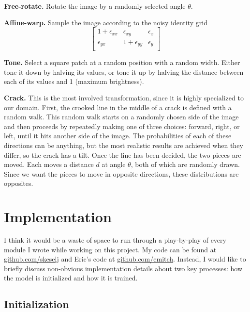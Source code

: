 \documentclass[12pt,a4paper]{article}
\begin{document}
{\bf Free-rotate.} Rotate the image by a randomly selected angle $\theta$. 

{\bf Affine-warp.} Sample the image according to the noisy identity grid 
\[
\begin{bmatrix}
    1 + \epsilon_{xx}		& \epsilon_{xy}  		& \epsilon_{x} \\
    \epsilon_{yx}       	& 1 + \epsilon_{yy}  	& \epsilon_{y} \\
\end{bmatrix}
\]

{\bf Tone.} Select a square patch at a random position with a random width. Either tone it down by halving its values, or tone it up by halving the distance between each of its values and 1 (maximum brightness).

{\bf Crack.} This is the most involved transformation, since it is highly specialized to our domain. First, the crooked line in the middle of a crack is defined with a random walk. This random walk starts on a randomly chosen side of the image and then proceeds by repeatedly making one of three choices: forward, right, or left, until it hits another side of the image. The probabilities of each of these directions can be anything, but the most realistic results are achieved when they differ, so the crack has a tilt. Once the line has been decided, the two pieces are moved. Each moves a distance $d$ at angle $\theta$, both of which are randomly drawn. Since we want the pieces to move in opposite directions, these distributions are opposites.

\newpage



\section{Implementation}

I think it would be a waste of space to run through a play-by-play of every module I wrote while working on this project. My code can be found at \href{github.com/skeselj}{github.com/skeselj} and Eric's code at \href{github.com/emitch}{github.com/emitch}. Instead, I would like to briefly discuss non-obvious implementation details about two key processes: how the model is initialized and how it is trained.

\subsection{Initialization}
\end{document}
